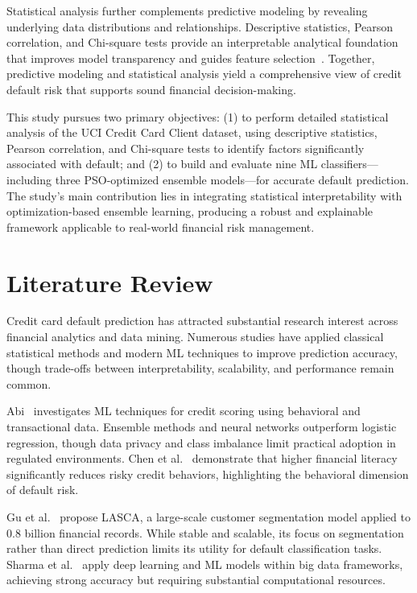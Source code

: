 \documentclass[sigconf]{acmart}
\begin{document}
Statistical analysis further complements predictive modeling by revealing underlying data distributions and relationships. Descriptive statistics, Pearson correlation, and Chi-square tests provide an interpretable analytical foundation that improves model transparency and guides feature selection~\cite{hand2001idiot}. Together, predictive modeling and statistical analysis yield a comprehensive view of credit default risk that supports sound financial decision-making.

This study pursues two primary objectives: (1) to perform detailed statistical analysis of the UCI Credit Card Client dataset, using descriptive statistics, Pearson correlation, and Chi-square tests to identify factors significantly associated with default; and (2) to build and evaluate nine ML classifiers---including three PSO-optimized ensemble models---for accurate default prediction. The study's main contribution lies in integrating statistical interpretability with optimization-based ensemble learning, producing a robust and explainable framework applicable to real-world financial risk management.

\section{Literature Review}

Credit card default prediction has attracted substantial research interest across financial analytics and data mining. Numerous studies have applied classical statistical methods and modern ML techniques to improve prediction accuracy, though trade-offs between interpretability, scalability, and performance remain common.

Abi~\cite{abi2025ml} investigates ML techniques for credit scoring using behavioral and transactional data. Ensemble methods and neural networks outperform logistic regression, though data privacy and class imbalance limit practical adoption in regulated environments. Chen et al.~\cite{chen2023} demonstrate that higher financial literacy significantly reduces risky credit behaviors, highlighting the behavioral dimension of default risk.

Gu et al.~\cite{gu2024lasca} propose LASCA, a large-scale customer segmentation model applied to 0.8 billion financial records. While stable and scalable, its focus on segmentation rather than direct prediction limits its utility for default classification tasks. Sharma et al.~\cite{sharma2024deep} apply deep learning and ML models within big data frameworks, achieving strong accuracy but requiring substantial computational resources.
\end{document}
